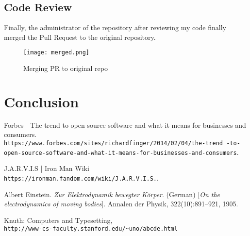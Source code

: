 \documentclass[12pt]{article}
\begin{document}
  \subsection{Code Review}
  
  Finally, the administrator of the repository after reviewing my code finally merged the Pull Request to the original repository.
  
  \begin{figure}[h]
\centerline{\texttt{[image: merged.png]}}
  \caption{Merging PR to original repo}
  \label{fig:verticalcell}
\end{figure}
  
\section{Conclusion}
  
  
\begin{thebibliography}{9}

Forbes - The trend to open source software and what it means for businesses and consumers.
\\\texttt{https://www.forbes.com/sites/richardfinger/2014/02/04/the-trend
-to-open-source-software-and-what-it-means-for-businesses-and-consumers}.

J.A.R.V.I.S | Iron Man Wiki
\\\texttt{https://ironman.fandom.com/wiki/J.A.R.V.I.S.}.

Albert Einstein. 
\textit{Zur Elektrodynamik bewegter K{\"o}rper}. (German) 
[\textit{On the electrodynamics of moving bodies}]. 
Annalen der Physik, 322(10):891–921, 1905.
 
Knuth: Computers and Typesetting,
\\\texttt{http://www-cs-faculty.stanford.edu/\~{}uno/abcde.html}
\end{thebibliography}
  
\end{document}
